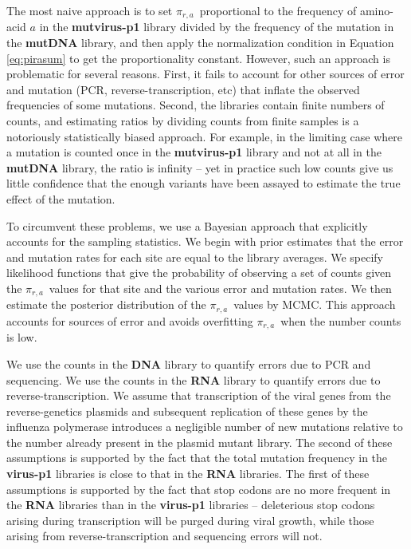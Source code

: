 \documentclass[12pt,draft]{article}
\newcommand{\pira}{\mbox{$\pi_{r,a}$}}
\begin{document}
The most naive approach is to set \pira\ proportional to the frequency of amino-acid $a$ in the {\bf mutvirus-p1} library divided by the frequency of the mutation in the {\bf mutDNA} library, and then apply the normalization condition in Equation \ref{eq:pirasum} to get the proportionality constant. However, such an approach is problematic for several reasons. First, it fails to account for other sources of error and mutation (PCR, reverse-transcription, etc) that inflate the observed frequencies of some mutations. Second, the libraries contain finite numbers of counts, and estimating ratios by dividing counts from finite samples is a notoriously statistically biased approach. For example, in the limiting case where a mutation is counted once in the {\bf mutvirus-p1} library and not at all in the {\bf mutDNA} library, the ratio is infinity  -- yet in practice such low counts give us little confidence that the enough variants have been assayed to estimate the true effect of the mutation.

To circumvent these problems, we use a Bayesian approach that explicitly accounts for the sampling statistics. We begin with prior estimates that the error and mutation rates for each site are equal to the library averages. We specify likelihood functions that give the probability of observing a set of counts given the \pira\ values for that site and the various error and mutation rates. We then estimate the posterior distribution of the \pira\ values by MCMC. This approach accounts for sources of error and avoids overfitting \pira\ when the number counts is low. 

We use the counts in the {\bf DNA} library to quantify errors due to PCR and sequencing. We use the counts in the {\bf RNA} library to quantify errors due to reverse-transcription. We assume that transcription of the viral genes from the reverse-genetics plasmids and subsequent replication of these genes by the influenza polymerase introduces a negligible number of new mutations relative to the number already present in the plasmid mutant library. The second of these assumptions is supported by the fact that the total mutation frequency in the {\bf virus-p1} libraries is close to that in the {\bf RNA} libraries. The first of these assumptions is supported by the fact that stop codons are no more frequent in the {\bf RNA} libraries than in the {\bf virus-p1} libraries  -- deleterious stop codons arising during transcription will be purged during viral growth, while those arising from reverse-transcription and sequencing errors will not.
\end{document}
